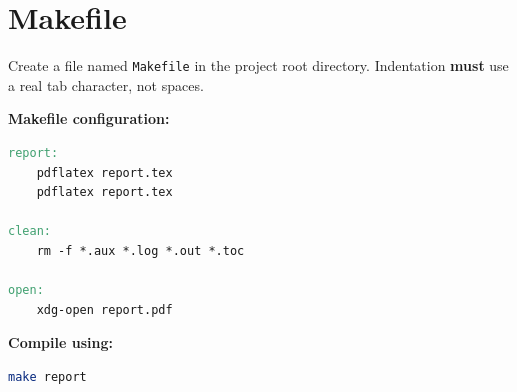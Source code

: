 \documentclass[12pt,a4paper]{article}
\begin{document}
\section{Makefile}

Create a file named \texttt{Makefile} in the project root directory. Indentation \textbf{must} use a real tab character, not spaces.

\noindent\begin{minipage}{\linewidth}
\textbf{Makefile configuration:}
\begin{lstlisting}[language=make]
report:
	pdflatex report.tex
	pdflatex report.tex

clean:
	rm -f *.aux *.log *.out *.toc

open:
	xdg-open report.pdf
\end{lstlisting}
\end{minipage}
\vspace{1em}

\noindent\begin{minipage}{\linewidth}
\textbf{Compile using:}
\begin{lstlisting}[language=bash]
make report
\end{lstlisting}
\end{minipage}
\end{document}
